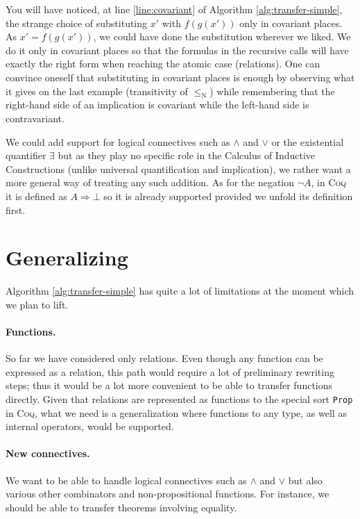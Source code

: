\documentclass{llncs}
\begin{document}
You will have noticed, at line \ref{line:covariant} of Algorithm
\ref{alg:transfer-simple}, the strange choice of substituting $x'$ with
$f(g(x'))$ only in covariant places. As $x' = f(g(x'))$, we could
have done the substitution wherever we liked. We do it only in
covariant places so that the formulas in the recursive calls will have
exactly the right form when reaching the atomic case (relations).
One can convince oneself that substituting in covariant
places is enough by observing what it gives on the last example
(transitivity of $\leq_{\mathrm{N}}$)
while remembering that the right-hand side of an
implication is covariant while the left-hand side is contravariant.

We could add support for logical connectives
such as $\wedge$ and $\vee$ or
the existential quantifier $\exists$ but as they play
no specific role in the Calculus of Inductive Constructions
(unlike universal quantification and implication),
we rather want a more general way of treating any such addition.
As for the negation $\neg A$, in \textsc{Coq} it is defined as
$A \Rightarrow \bot$ so it is already supported
provided we unfold its definition first.

\section{Generalizing}

Algorithm \ref{alg:transfer-simple} has quite a lot of limitations at the moment
which we plan to lift.

\paragraph{Functions.}
So far we have considered only relations. Even though any function can be expressed as a relation,
this path would require a lot of preliminary rewriting steps; thus
it would be a lot more convenient to be able to transfer functions directly.
Given that relations are represented as functions to the special sort \texttt{Prop} in \textsc{Coq},
what we need is a generalization where functions to any type, as well as
internal operators, would be supported.

\paragraph{New connectives.}
We want to be able to handle logical connectives such as $\wedge$ and $\vee$ but also various
other combinators and non-propositional functions.
For instance, we should be able to transfer theorems involving equality.
\end{document}
